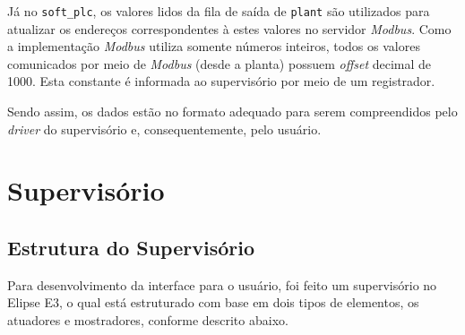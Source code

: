\documentclass[
	article,			%
	11pt,				%
	oneside,			%
	a4paper,			%
	section=TITLE,		%
	english,			%
	brazil,				%
	sumario=tradicional
	]{abntex2}
\newcommand{\EE}{Elipse E3}%
\newcommand{\Mb}{\textit{Modbus}}%
\begin{document}
Já no \texttt{soft\_plc}, os valores lidos da fila de saída de \texttt{plant} são utilizados para atualizar os endereços correspondentes à estes valores no servidor \Mb{}. Como a implementação \Mb{} utiliza somente números inteiros, todos os valores comunicados por meio de \Mb{} (desde a planta) possuem \textit{offset} decimal de 1000. Esta constante é informada ao supervisório por meio de um registrador. 

Sendo assim, os dados estão no formato adequado para serem compreendidos pelo \textit{driver} do supervisório e, consequentemente, pelo usuário.

\section{Supervisório}
\subsection{Estrutura do Supervisório}
Para desenvolvimento da interface para o usuário, foi feito um supervisório no \EE, o qual está estruturado com base em dois tipos de elementos, os atuadores e mostradores, conforme descrito abaixo.
 
\end{document}
